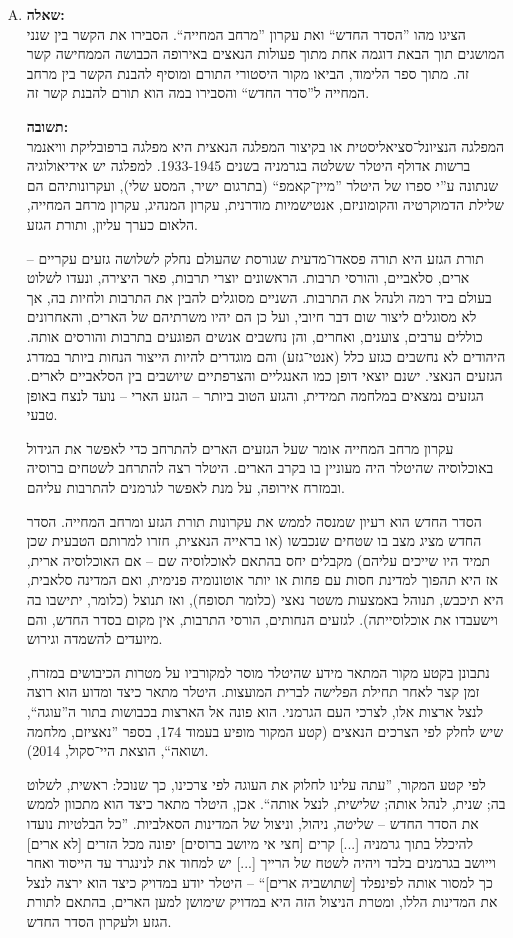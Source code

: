 \documentclass[a4paper]{article}
\newcommand\hl[1]   {#1}
\begin{document}
\begin{enumerate}[A.]
			\item \textbf{שאלה: }\\
			הציגו מהו ''הסדר החדש`` ואת עקרון ''מרחב המחייה``. הסבירו את הקשר בין שנני המושגים תוך הבאת דוגמה אחת מתוך פעולות הנאצים באירופה הכבושה הממחישה קשר זה. מתוך ספר הלימוד, הביאו מקור היסטורי התורם ומוסיף להבנת הקשר בין מרחב המחייה ל''סדר החדש`` והסבירו במה הוא תורם להבנת קשר זה. 
			
			\textbf{תשובה: }\\
			המפלגה הנציונל־סציאליסטית או בקיצור המפלגה ה\hl{נאצית} היא מפלגה ברפובליקת וויאנמר ברשות \hl{אדולף היטלר} ששלטה בגרמניה בשנים 1933-1945. למפלגה יש אידיאולוגיה שנתונה ע''י ספרו של היטלר ''מיין־קאמפ`` (בתרגום ישיר, המסע שלי), ועקרונותיהם הם שלילת הדמוקרטיה והקומוניזם, אנטישמיות מודרנית, עקרון המנהיג, עקרון מרחב המחייה, הלאום כערך עליון, ותורת הגזע. 
			
			תורת הגזע היא תורה פסאדו־מדעית שגורסת שהעולם נחלק לשלושה גזעים עקריים – ארים, סלאביים, והורסי תרבות. הראשונים יוצרי תרבות, פאר היצירה, ונעדו לשלוט בעולם ביד רמה ולנהל את התרבות. השניים מסוגלים להבין את התרבות ולחיות בה, אך לא מסוגלים ליצור שום דבר חיובי, ועל כן הם יהיו משרתיהם של הארים, והאחרונים כוללים ערבים, צוענים, ואחרים, והן נחשבים אנשים הפוגעים בתרבות והורסים אותה. היהודים לא נחשבים כגזע כלל (אנטי־גזע) והם מוגדרים להיות הייצור הנחות ביותר במדרג הגזעים הנאצי. ישנם יוצאי דופן כמו האנגליים והצרפתיים שיושבים בין הסלאביים לארים. הגזעים נמצאים במלחמה תמידית, והגזע הטוב ביותר – הגזע הארי – נועד לנצח באופן טבעי. 
			
			עקרון מרחב המחייה אומר שעל הגזעים הארים להתרחב כדי לאפשר את הגידול באוכלוסיה שהיטלר היה מעוניין בו בקרב הארים. היטלר רצה להתרחב לשטחים ברוסיה ובמזרח אירופה, על מנת לאפשר לגרמנים להתרבות עליהם. 
			
			\hl{הסדר החדש} הוא רעיון שמנסה לממש את עקרונות תורת הגזע ומרחב המחייה. הסדר החדש מציג מצב בו שטחים שנכבשו (או בראייה הנאצית, חזרו למרותם הטבעית שכן תמיד היו שייכים עליהם) מקבלים יחס בהתאם לאוכלוסיה שם – אם האוכלוסיה ארית, אז היא תהפוך למדינת חסות עם פחות או יותר אוטונומיה פנימית, ואם המדינה סלאבית, היא תיכבש, תנוהל באמצעות משטר נאצי (כלומר תסופח), ואז תנוצל (כלומר, יתישבו בה וישעבדו את אוכלוסייתה). לגזעים הנחותים, הורסי התרבות, אין מקום בסדר החדש, והם מיועדים להשמדה וגירוש. 
			
			נתבונן בקטע מקור המתאר מידע שהיטלר מוסר למקורביו על מטרות הכיבושים במזרח, זמן קצר לאחר תחילת הפלישה לברית המועצות. היטלר מתאר כיצד ומדוע הוא רוצה לנצל ארצות אלו, לצרכי העם הגרמני. הוא פונה אל הארצות בכבושות בתור ה''עוגה``, שיש לחלק לפי הצרכים הנאצים (קטע המקור מופיע בעמוד 174, בספר ''נאציזם, מלחמה ושואה``, הוצאת היי־סקול, 2014). 
			
			לפי קטע המקור, ''עתה עלינו לחלוק את העוגה לפי צרכינו, כך שנוכל: ראשית, לשלוט בה; שנית, לנהל אותה; שלישית, לנצל אותה``. אכן, היטלר מתאר כיצד הוא מתכוון לממש את הסדר החדש – שליטה, ניהול, וניצול של המדינות הסאלביות. ''כל הבלטיות נועדו להיכלל בתוך גרמניה [...] קרים [חצי אי מיושב ברוסים] יפונה מכל הזרים [לא ארים] וייושב בגרמנים בלבד ויהיה לשטח של הרייך [...] יש למחוד את לנינגרד עד הייסוד ואחר כך למסור אותה לפינפלד [שתושביה ארים]`` – היטלר יודע במדויק כיצד הוא ירצה לנצל את המדינות הללו, ומטרת הניצול הזה היא במדויק שימושן למען הארים, בהתאם לתורת הגזע ולעקרון הסדר החדש. 
		\end{enumerate}
	
	
\end{document}
